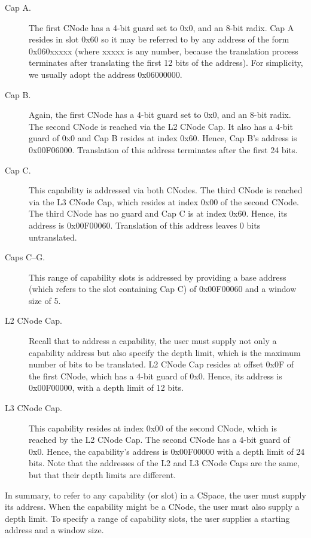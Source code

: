 \begin{description}
\item[Cap A.] The first CNode has a 4-bit guard set to 0x0, and an
  8-bit radix. Cap A resides in slot 0x60 so it may be referred to by
  any address of the form 0x060xxxxx (where xxxxx is any number,
  because the translation process terminates after translating the
  first 12 bits of the address). For simplicity, we usually adopt the
  address 0x06000000.

\item[Cap B.] Again, the first CNode has a 4-bit guard set to 0x0, and
  an 8-bit radix. The second CNode is reached via the L2 CNode Cap.
  It also has a 4-bit guard of 0x0 and Cap B resides at index
  0x60. Hence, Cap B's address is 0x00F06000.  Translation of this
  address terminates after the first 24 bits.

\item[Cap C.] This capability is addressed via both CNodes. The third
  CNode is reached via the L3 CNode Cap, which resides at index 0x00
  of the second CNode. The third CNode has no guard and Cap C is at
  index 0x60.  Hence, its address is 0x00F00060. Translation of this
  address leaves 0 bits untranslated.

\item[Caps C--G.] This range of capability slots is addressed by
  providing a base address (which refers to the slot containing Cap C)
  of 0x00F00060 and a window size of 5.

\item[L2 CNode Cap.] Recall that to address a  capability,
  the user must supply not only a capability address but also specify
  the depth limit, which is the maximum number of bits to be
  translated.  L2 CNode Cap resides at offset 0x0F of the first CNode,
  which has a 4-bit guard of 0x0.  Hence, its address is 0x00F00000,
  with a depth limit of 12 bits.

\item[L3 CNode Cap.] This capability resides at index 0x00 of the
  second CNode, which is reached by the L2 CNode Cap. The second CNode
  has a 4-bit guard of 0x0. Hence, the capability's address is
  0x00F00000 with a depth limit of 24 bits. Note that the addresses of
  the L2 and L3 CNode Caps are the same, but that their depth limits
  are different.
\end{description}

In summary, to refer to any capability (or slot) in a CSpace, the user
must supply its address. When the capability might be a CNode, the
user must also supply a depth limit.  To specify a range of capability
slots, the user supplies a starting address and a window size.

